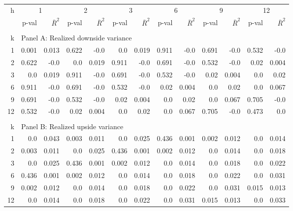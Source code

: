 \documentclass{article}
\begin{document}
\begin{center}
\hspace*{-3cm}
\begin{tabular}{@{\extracolsep{6pt}}rrrrrrrrrrrrr@{}}

\hline

h & \multicolumn{2}{c}{1} & \multicolumn{2}{c}{2} & \multicolumn{2}{c}{3} & \multicolumn{2}{c}{6} & \multicolumn{2}{c}{9} & \multicolumn{2}{c}{12} \\[6pt]

\cline{2-3} \cline{4-5} \cline{6-7} \cline{8-9} \cline{10-11} \cline{12-13}

 & p-val & $\bar{R}^{2}$ & p-val & $\bar{R}^{2}$ &  p-val & $\bar{R}^{2}$ &  
 p-val & $\bar{R}^{2}$ &  p-val & $\bar{R}^{2}$ &  p-val & $\bar{R}^{2}$ \\[6pt]
 
\hline\\[0.000000001pt]

k & \multicolumn{12}{l}{Panel A: Realized downside variance} \\[7pt]

\hline

1 & 0.001 & 0.013 & 0.622 & -0.0 & 0.0 & 0.019 & 0.911 & -0.0 & 0.691 & -0.0 & 0.532 & -0.0 \\[6pt]
2 & 0.622 & -0.0 & 0.0 & 0.019 & 0.911 & -0.0 & 0.691 & -0.0 & 0.532 & -0.0 & 0.02 & 0.004 \\[6pt]
3 & 0.0 & 0.019 & 0.911 & -0.0 & 0.691 & -0.0 & 0.532 & -0.0 & 0.02 & 0.004 & 0.0 & 0.02 \\[6pt]
6 & 0.911 & -0.0 & 0.691 & -0.0 & 0.532 & -0.0 & 0.02 & 0.004 & 0.0 & 0.02 & 0.0 & 0.067 \\[6pt]
9 & 0.691 & -0.0 & 0.532 & -0.0 & 0.02 & 0.004 & 0.0 & 0.02 & 0.0 & 0.067 & 0.705 & -0.0 \\[6pt]
12 & 0.532 & -0.0 & 0.02 & 0.004 & 0.0 & 0.02 & 0.0 & 0.067 & 0.705 & -0.0 & 0.473 & 0.0 \\[6pt]

\hline\\[0.000000001pt]

k & \multicolumn{12}{l}{Panel B: Realized upside variance} \\[7pt]

\hline

1 & 0.0 & 0.043 & 0.003 & 0.011 & 0.0 & 0.025 & 0.436 & 0.001 & 0.002 & 0.012 & 0.0 & 0.014 \\[6pt]
2 & 0.003 & 0.011 & 0.0 & 0.025 & 0.436 & 0.001 & 0.002 & 0.012 & 0.0 & 0.014 & 0.0 & 0.018 \\[6pt]
3 & 0.0 & 0.025 & 0.436 & 0.001 & 0.002 & 0.012 & 0.0 & 0.014 & 0.0 & 0.018 & 0.0 & 0.022 \\[6pt]
6 & 0.436 & 0.001 & 0.002 & 0.012 & 0.0 & 0.014 & 0.0 & 0.018 & 0.0 & 0.022 & 0.0 & 0.031 \\[6pt]
9 & 0.002 & 0.012 & 0.0 & 0.014 & 0.0 & 0.018 & 0.0 & 0.022 & 0.0 & 0.031 & 0.015 & 0.013 \\[6pt]
12 & 0.0 & 0.014 & 0.0 & 0.018 & 0.0 & 0.022 & 0.0 & 0.031 & 0.015 & 0.013 & 0.0 & 0.033 \\[6pt]


\end{tabular}
\end{center}
\end{document}
